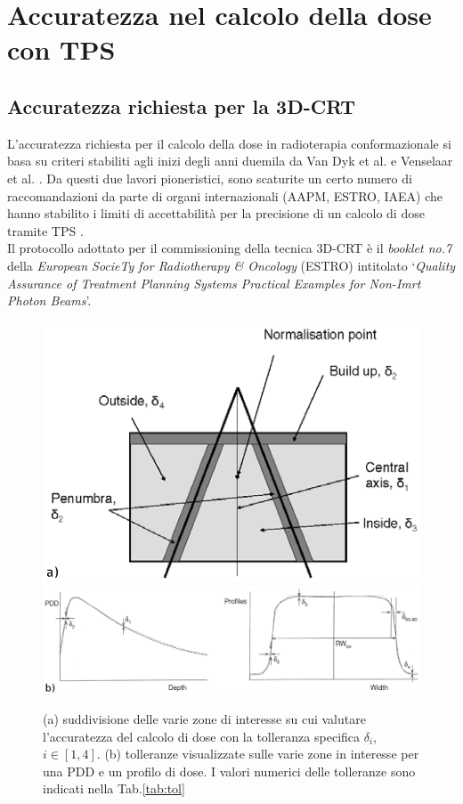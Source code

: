 \section{Accuratezza nel calcolo della dose con TPS}
\subsection{Accuratezza richiesta per la 3D-CRT}
\label{sec:accu_3D}
L'accuratezza richiesta per il calcolo della dose in radioterapia conformazionale si basa su criteri stabiliti agli inizi degli anni duemila da Van Dyk et al. e Venselaar et al. \cite{Dyk1993,Venselaar2001}. Da questi due lavori pioneristici, sono scaturite un certo numero di raccomandazioni da parte di organi internazionali (AAPM, ESTRO, IAEA) che hanno stabilito i limiti di accettabilità per la precisione di un calcolo di dose tramite TPS \cite{Fraass1998,Mijnheer2004,IAEA430}.\\
Il protocollo adottato per il commissioning della tecnica 3D-CRT è il \textit{booklet no.7} della \textit{European SocieTy for Radiotherapy \& Oncology} (ESTRO) intitolato `\textit{Quality Assurance of Treatment Planning Systems Practical Examples for Non-Imrt Photon Beams}'. 
\begin{figure}[!t]
\centering
\includegraphics[width=.65\textwidth]{./cap2/Accuracy_zones.png}\\\vspace{.3cm}
\includegraphics[width=\textwidth]{./cap2/Accuracy_pdd_prof.png}
\caption{(a) suddivisione delle varie zone di interesse su cui valutare l'accuratezza del calcolo di dose con la tolleranza specifica $\delta_i$, $i\in[1,4]$. (b) tolleranze visualizzate sulle varie zone in interesse per una PDD e un profilo di dose. I valori numerici delle tolleranze sono indicati nella Tab.\ref{tab:tol}}
\label{fig:accuracy_zones}
\end{figure}

